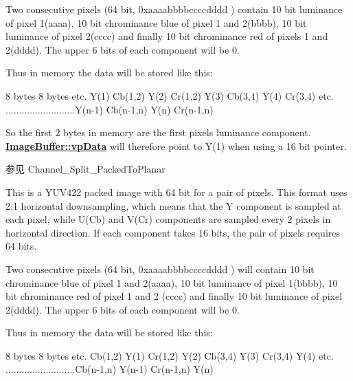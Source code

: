 \begin{Desc}
\begin{description}
Two consecutive pixels (64 bit, 0xaaaabbbbccccdddd ) contain 10 bit luminance of pixel 1(aaaa), 10 bit chrominance blue of pixel 1 and 2(bbbb), 10 bit luminance of pixel 2(cccc) and finally 10 bit chrominance red of pixels 1 and 2(dddd). The upper 6 bits of each component will be 0.

Thus in memory the data will be stored like this\+:


\begin{DoxyCode}
8 bytes                   8 bytes                         etc.
Y(1) Cb(1,2) Y(2) Cr(1,2) Y(3)   Cb(3,4)   Y(4) Cr(3,4)   etc.
..........................Y(n-1) Cb(n-1,n) Y(n) Cr(n-1,n)
\end{DoxyCode}


So the first 2 bytes in memory are the first pixels luminance component. {\bfseries \hyperlink{struct_image_buffer_ab67c9c21d749e786302c848b508e0673}{Image\+Buffer\+::vp\+Data}} will therefore point to Y(1) when using a 16 bit pointer.

\begin{DoxySeeAlso}{参见}
Channel\+\_\+\+Split\+\_\+\+Packed\+To\+Planar 
\end{DoxySeeAlso}
\item[{\em 
\hypertarget{group___common_interface_gga02e0fc32ff10e0bc0f2e8b9c321d65c9a204d2fd78d3e03340516929d9eb64a39}{idpf\+Y\+U\+V422\+\_\+\+U\+Y\+V\+Y\+\_\+10\+Packed}\label{group___common_interface_gga02e0fc32ff10e0bc0f2e8b9c321d65c9a204d2fd78d3e03340516929d9eb64a39}
}]This is a Y\+U\+V422 packed image with 64 bit for a pair of pixels. This format uses 2\+:1 horizontal downsampling, which means that the Y component is sampled at each pixel, while U(\+Cb) and V(\+Cr) components are sampled every 2 pixels in horizontal direction. If each component takes 16 bits, the pair of pixels requires 64 bits.

Two consecutive pixels (64 bit, 0xaaaabbbbccccdddd ) will contain 10 bit chrominance blue of pixel 1 and 2(aaaa), 10 bit luminance of pixel 1(bbbb), 10 bit chrominance red of pixel 1 and 2 (cccc) and finally 10 bit luminance of pixel 2(dddd). The upper 6 bits of each component will be 0.

Thus in memory the data will be stored like this\+:


\begin{DoxyCode}
8 bytes                   8 bytes                         etc.
Cb(1,2) Y(1) Cr(1,2) Y(2) Cb(3,4)   Y(3)   Cr(3,4)   Y(4)    etc.
..........................Cb(n-1,n) Y(n-1) Cr(n-1,n) Y(n)
\end{DoxyCode}



\end{description}
\end{Desc}
